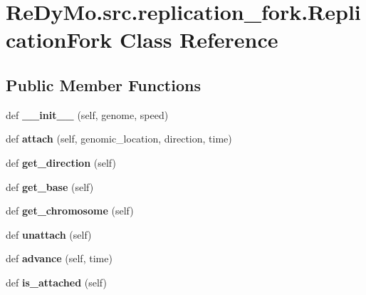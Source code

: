 \hypertarget{classReDyMo_1_1src_1_1replication__fork_1_1ReplicationFork}{}\section{Re\+Dy\+Mo.\+src.\+replication\+\_\+fork.\+Replication\+Fork Class Reference}
\label{classReDyMo_1_1src_1_1replication__fork_1_1ReplicationFork}
\subsection*{Public Member Functions}
\begin{DoxyCompactItemize}
\item 
\mbox{\label{classReDyMo_1_1src_1_1replication__fork_1_1ReplicationFork_a33deb5c1f40c77b4c2d0ad873865ae20}} 
def {\bfseries \+\_\+\+\_\+init\+\_\+\+\_\+} (self, genome, speed)
\item 
\mbox{\label{classReDyMo_1_1src_1_1replication__fork_1_1ReplicationFork_a616af5a3e5cb32dfad3023df09dffee2}} 
def {\bfseries attach} (self, genomic\+\_\+location, direction, time)
\item 
\mbox{\label{classReDyMo_1_1src_1_1replication__fork_1_1ReplicationFork_a8c78154d928c20a98cc1487aabab027a}} 
def {\bfseries get\+\_\+direction} (self)
\item 
\mbox{\label{classReDyMo_1_1src_1_1replication__fork_1_1ReplicationFork_af49d73c45344c7ede5b77002d343d8d7}} 
def {\bfseries get\+\_\+base} (self)
\item 
\mbox{\label{classReDyMo_1_1src_1_1replication__fork_1_1ReplicationFork_a65ec2334d2e80c8b204670a63219e5b9}} 
def {\bfseries get\+\_\+chromosome} (self)
\item 
\mbox{\label{classReDyMo_1_1src_1_1replication__fork_1_1ReplicationFork_a093632b2000c853a2a7c5312c6c6916b}} 
def {\bfseries unattach} (self)
\item 
\mbox{\label{classReDyMo_1_1src_1_1replication__fork_1_1ReplicationFork_acda54ba4aba3f2a9c02036626e20aa73}} 
def {\bfseries advance} (self, time)
\item 
\mbox{\label{classReDyMo_1_1src_1_1replication__fork_1_1ReplicationFork_a20750a4ee72864cc2f7126e53fd06410}} 
def {\bfseries is\+\_\+attached} (self)
\end{DoxyCompactItemize}
